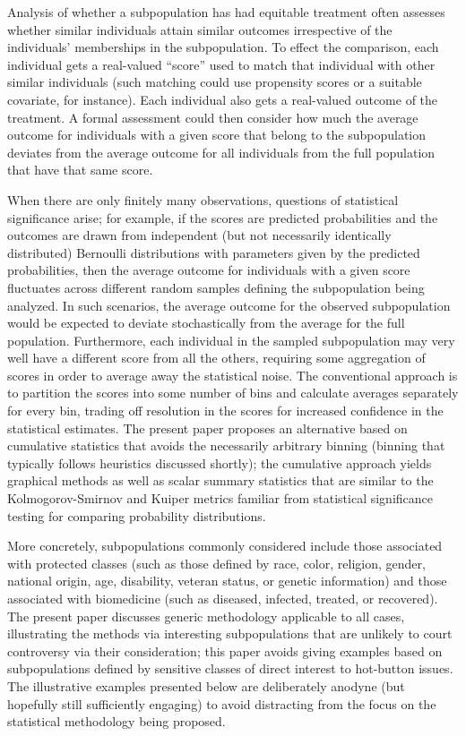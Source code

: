 \documentclass{article}
\begin{document}
Analysis of whether a subpopulation has had equitable treatment
often assesses whether similar individuals attain similar outcomes
irrespective of the individuals' memberships in the subpopulation.
To effect the comparison, each individual gets a real-valued ``score''
used to match that individual with other similar individuals
(such matching could use propensity scores or a suitable covariate,
for instance).
Each individual also gets a real-valued outcome of the treatment.
A formal assessment could then consider how much the average outcome
for individuals with a given score that belong to the subpopulation
deviates from the average outcome for all individuals from the full population
that have that same score.

When there are only finitely many observations,
questions of statistical significance arise;
for example, if the scores are predicted probabilities
and the outcomes are drawn from independent (but not necessarily
identically distributed) Bernoulli distributions with parameters
given by the predicted probabilities, then the average outcome
for individuals with a given score fluctuates across different random samples
defining the subpopulation being analyzed.
In such scenarios, the average outcome for the observed subpopulation
would be expected to deviate stochastically from the average
for the full population.
Furthermore, each individual in the sampled subpopulation may very well
have a different score from all the others, requiring some aggregation
of scores in order to average away the statistical noise.
The conventional approach is to partition the scores into some number of bins
and calculate averages separately for every bin, trading off resolution
in the scores for increased confidence in the statistical estimates.
The present paper proposes an alternative based on cumulative statistics
that avoids the necessarily arbitrary binning
(binning that typically follows heuristics discussed shortly);
the cumulative approach yields graphical methods
as well as scalar summary statistics that are similar
to the Kolmogorov-Smirnov and Kuiper metrics familiar
from statistical significance testing for comparing probability distributions.

More concretely, subpopulations commonly considered include those associated
with protected classes (such as those defined by race, color, religion, gender,
national origin, age, disability, veteran status, or genetic information)
and those associated with biomedicine (such as diseased, infected, treated,
or recovered).
The present paper discusses generic methodology applicable to all cases,
illustrating the methods via interesting subpopulations that are unlikely
to court controversy via their consideration; this paper avoids
giving examples based on subpopulations defined by sensitive classes
of direct interest to hot-button issues.
The illustrative examples presented below are deliberately anodyne
(but hopefully still sufficiently engaging) to avoid distracting
from the focus on the statistical methodology being proposed.
\end{document}
